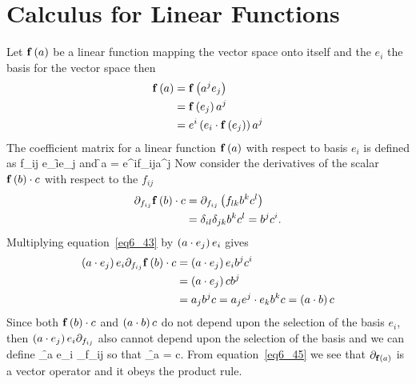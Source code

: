 \section{Calculus for Linear Functions}
Let ${\mathbf{f}}\left ( {a} \right )$ be a linear function mapping the vector space onto itself and the $e_{i}$ the basis for the vector space then
\begin{align}
    {\mathbf{f}}\left ( {a} \right ) &= {\mathbf{f}}\left ( {a^{j}e_{j}} \right ) \nonumber \\
                 &= {\mathbf{f}}\left ( {e_{j}} \right ) a^{j} \nonumber \\
                 &= e^{i}\left ( e_{i}\cdot{\mathbf{f}}\left ( {e_{j}} \right )\right ) a^{j}
\end{align}
The coefficient matrix for a linear function ${\mathbf{f}}\left ( {a} \right )$ with respect to basis $e_{i}$ is defined as
\be
	f_{ij} \equiv e_{i}\cdot\f{\fbld}{e_{j}}
\ee
and
\be
     \f{\fbld}{a} = e^{i}f_{ij}a^{j}
\ee
Now consider the derivatives of the scalar ${\mathbf{f}}\left ( {b} \right )\cdot c$ with respect to the $f_{ij}$
\begin{align}
	\partial_{f_{ij}}{\mathbf{f}}\left ( {b} \right )\cdot c &= \partial_{f_{ij}}\left ( {f_{lk}b^{k}c^{l}} \right ) \nonumber \\
	                                     &= \delta_{il}\delta_{jk}b^{k}c^{l} = b^{j}c^{i} \label{eq6_43}.
\end{align}
Multiplying equation~\ref{eq6_43} by $\left ( {a\cdot e_{j}} \right ) e_{i}$ gives
\begin{align}
	\left ( {a\cdot e_{j}} \right ) e_{i}\partial_{f_{ij}}{\mathbf{f}}\left ( {b} \right )\cdot c &= \left ( {a\cdot e_{j}} \right ) e_{i}b^{j}c^{i} \nonumber \\
	                                                              &= \left ( {a\cdot e_{j}} \right ) cb^{j} \nonumber \\
	                                                              &= a_{j}b^{j}c = a_{j}e^{j}\cdot e_{k}b^{k}c = \left ( {a\cdot b} \right ) c \label{eq6_44}
\end{align}
Since both ${\mathbf{f}}\left ( {b} \right )\cdot c$ and $\left ( {a\cdot b} \right ) c$ do not depend upon the selection of the basis $e_{i}$, then 
$\left ( {a\cdot e_{j}} \right ) e_{i}\partial_{f_{ij}}$ also cannot depend upon the selection of the basis and we can define
\be
	\partial_{\f{\fbld}{a}} \equiv {}e_{i} \partial_{f_{ij}} \label{eq6_45}
\ee
so that
\be
	\partial_{\f{\fbld}{a}}  = c.
\ee
From equation~\ref{eq6_45} we see that $\partial_{{\mathbf{f}}\left ( {a} \right )}$ is a vector operator and it obeys the product rule.


